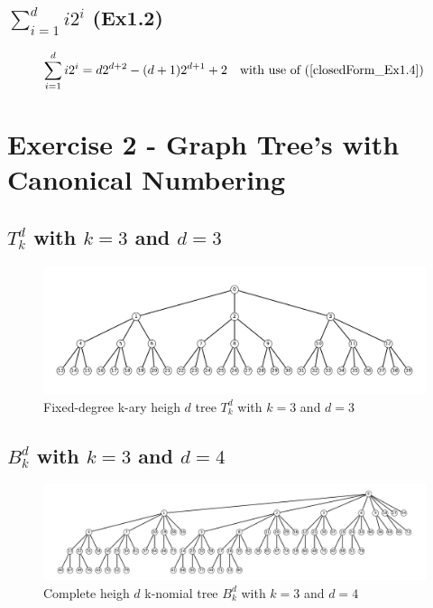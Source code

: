 \subsection{$\sum_{i=1}^d i2^i$ (Ex1.2)}

\begin{equation}
    \begin{aligned}
        \sum_{i=1}^d i2^i = d  2^{d+2} - (d+1)2^{d+1} + 2 \quad \text{with use of (\ref{closedForm_Ex1.4})}
    \end{aligned}
\end{equation}

\pagebreak

\section{Exercise 2 - Graph Tree's with Canonical Numbering}
\subsection{$T^d_k$ with $k=3$ and $d=3$}

\begin{figure}[h]
    \begin{center}
        \includegraphics[width=\linewidth]{figures/Ex1_2_a.pdf}
        \caption{Fixed-degree k-ary heigh $d$ tree $T^d_k$ with $k=3$ and $d=3$}
    \end{center}
\end{figure}


\subsection{$B^d_k$ with $k=3$ and $d=4$}

\begin{figure}[h]
    \begin{center}
        \includegraphics[width=\linewidth]{figures/Ex1_2_b.pdf}
        \caption{Complete heigh $d$ k-nomial tree $B^d_k$ with $k=3$ and $d=4$}
    \end{center}
\end{figure}

